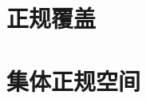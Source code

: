 \documentclass[main.tex]{subfiles}
\begin{document}
	
\section{正规覆盖}\label{ch3.1}

	
\section{集体正规空间}\label{ch3.2}

	
\end{document}
